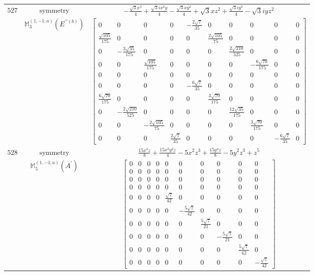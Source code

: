 \documentclass[fleqn,8pt,landscape]{jsarticle}
\begin{document}
\begin{longtable}{ccc}
$ 527 $ & $ \text{symmetry} $ & $ - \frac{\sqrt{3} x^{3}}{4} + \frac{\sqrt{3} i x^{2} y}{4} - \frac{\sqrt{3} x y^{2}}{4} + \sqrt{3} x z^{2} + \frac{\sqrt{3} i y^{3}}{4} - \sqrt{3} i y z^{2} $ \\
$  $ & $ \mathbb{M}_{3}^{(1,-1;a)}(E^{\prime\prime(b)}) $ & $ \begin{bmatrix} 0 & 0 & 0 & 0 & - \frac{2 \sqrt{7}}{35} & 0 & 0 & 0 & 0 & 0 \\ \frac{\sqrt{105}}{175} & 0 & 0 & 0 & 0 & \frac{2 \sqrt{105}}{75} & 0 & 0 & 0 & 0 \\ 0 & - \frac{3 \sqrt{35}}{175} & 0 & 0 & 0 & 0 & \frac{2 \sqrt{210}}{525} & 0 & 0 & 0 \\ 0 & 0 & \frac{\sqrt{105}}{175} & 0 & 0 & 0 & 0 & - \frac{6 \sqrt{70}}{175} & 0 & 0 \\ 0 & 0 & 0 & 0 & 0 & 0 & 0 & 0 & 0 & 0 \\ 0 & 0 & 0 & 0 & - \frac{6 \sqrt{7}}{35} & 0 & 0 & 0 & 0 & 0 \\ \frac{6 \sqrt{70}}{175} & 0 & 0 & 0 & 0 & \frac{3 \sqrt{70}}{175} & 0 & 0 & 0 & 0 \\ 0 & - \frac{2 \sqrt{210}}{525} & 0 & 0 & 0 & 0 & \frac{12 \sqrt{35}}{175} & 0 & 0 & 0 \\ 0 & 0 & - \frac{2 \sqrt{105}}{75} & 0 & 0 & 0 & 0 & \frac{3 \sqrt{70}}{175} & 0 & 0 \\ 0 & 0 & 0 & \frac{2 \sqrt{7}}{35} & 0 & 0 & 0 & 0 & - \frac{6 \sqrt{7}}{35} & 0 \end{bmatrix} $ \\ \hline
$ 528 $ & $ \text{symmetry} $ & $ \frac{15 x^{4} z}{8} + \frac{15 x^{2} y^{2} z}{4} - 5 x^{2} z^{3} + \frac{15 y^{4} z}{8} - 5 y^{2} z^{3} + z^{5} $ \\
$  $ & $ \mathbb{M}_{5}^{(1,-1;a)}(A^{\prime}) $ & $ \begin{bmatrix} 0 & 0 & 0 & 0 & 0 & 0 & 0 & 0 & 0 & 0 \\ 0 & 0 & 0 & 0 & 0 & 0 & 0 & 0 & 0 & 0 \\ 0 & 0 & 0 & 0 & 0 & 0 & 0 & 0 & 0 & 0 \\ 0 & 0 & 0 & 0 & 0 & 0 & 0 & 0 & 0 & 0 \\ 0 & 0 & 0 & 0 & \frac{\sqrt{7}}{42} & 0 & 0 & 0 & 0 & 0 \\ 0 & 0 & 0 & 0 & 0 & - \frac{5 \sqrt{7}}{42} & 0 & 0 & 0 & 0 \\ 0 & 0 & 0 & 0 & 0 & 0 & \frac{5 \sqrt{7}}{21} & 0 & 0 & 0 \\ 0 & 0 & 0 & 0 & 0 & 0 & 0 & - \frac{5 \sqrt{7}}{21} & 0 & 0 \\ 0 & 0 & 0 & 0 & 0 & 0 & 0 & 0 & \frac{5 \sqrt{7}}{42} & 0 \\ 0 & 0 & 0 & 0 & 0 & 0 & 0 & 0 & 0 & - \frac{\sqrt{7}}{42} \end{bmatrix} $ \\ \hline

\end{longtable}
\end{document}
